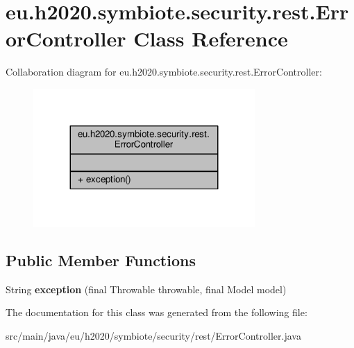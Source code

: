 \hypertarget{classeu_1_1h2020_1_1symbiote_1_1security_1_1rest_1_1ErrorController}{}\section{eu.\+h2020.\+symbiote.\+security.\+rest.\+Error\+Controller Class Reference}
\label{classeu_1_1h2020_1_1symbiote_1_1security_1_1rest_1_1ErrorController}


Collaboration diagram for eu.\+h2020.\+symbiote.\+security.\+rest.\+Error\+Controller\+:
\nopagebreak
\begin{figure}[H]
\begin{center}
\leavevmode
\includegraphics[width=239pt]{classeu_1_1h2020_1_1symbiote_1_1security_1_1rest_1_1ErrorController__coll__graph}
\end{center}
\end{figure}
\subsection*{Public Member Functions}
\begin{DoxyCompactItemize}
\item 
String {\bfseries exception} (final Throwable throwable, final Model model)\hypertarget{classeu_1_1h2020_1_1symbiote_1_1security_1_1rest_1_1ErrorController_a47948914af52f1fb02563de2ac3bcb48}{}\label{classeu_1_1h2020_1_1symbiote_1_1security_1_1rest_1_1ErrorController_a47948914af52f1fb02563de2ac3bcb48}

\end{DoxyCompactItemize}


The documentation for this class was generated from the following file\+:\begin{DoxyCompactItemize}
\item 
src/main/java/eu/h2020/symbiote/security/rest/Error\+Controller.\+java\end{DoxyCompactItemize}
